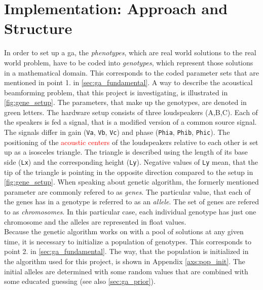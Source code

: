 \section{Implementation: Approach and Structure}
In order to set up a \gls{ga}, the \textit{phenotypes}, which are real world solutions to the real world problem, have to be coded into \textit{genotypes}, which represent those solutions in a mathematical domain. This corresponds to the coded parameter sets that are mentioned in point 1. in \autoref{sec:ga_fundamental}.
A way to describe the acoustical beamforming problem, that this project is investigating, is illustrated in \autoref{fig:gene_setup}. The parameters, that make up the genotypes, are denoted in \textcolor{green3}{green} letters. The hardware setup consists of three loudspeakers (A,B,C). Each of the speakers is fed a signal, that is a modified version of a common source signal. The signals differ in gain (\textcolor{green3}{\texttt{Va}}, \textcolor{green3}{\texttt{Vb}}, \textcolor{green3}{\texttt{Vc}}) and phase (\textcolor{green3}{\texttt{Phia}}, \textcolor{green3}{\texttt{Phib}}, \textcolor{green3}{\texttt{Phic}}). The positioning of the \textcolor{red}{acoustic centers} of the loudspeakers relative to each other is set up as a isosceles triangle. The triangle is described using the length of its base side (\textcolor{green3}{\texttt{Lx}}) and the corresponding height (\textcolor{green3}{\texttt{Ly}}). Negative values of \textcolor{green3}{\texttt{Ly}} mean, that the tip of the triangle is pointing in the opposite direction compared to the setup in \autoref{fig:gene_setup}. When speaking about genetic algorithm, the formerly mentioned parameter are commonly refered to as \textit{genes}. The particular value, that each of the genes has in a genotype is referred to as an \textit{allele}. The set of genes are refered to as \textit{chromosomes}. In this particular case, each individual genotype has just one chromosome and the alleles are represented in float values.\\
Because the genetic algorithm works on with a pool of solutions at any given time, it is necessary to initialize a population of genotypes. This corresponds to point 2. in \autoref{sec:ga_fundamental}. The way, that the population is initialized in the algorithm used for this project, is shown in Appendix \ref{axs:pop_init}. The initial alleles are determined with some random values that are combined with some educated guessing (see also \autoref{sec:ga_prior}).\\
